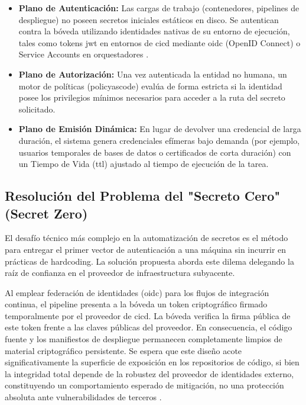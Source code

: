 \documentclass[runningheads]{llncs}
\begin{document}
\begin{itemize}
    \item \textbf{Plano de Autenticación:} Las cargas de trabajo (contenedores, pipelines de despliegue) no poseen secretos iniciales estáticos en disco. Se autentican contra la bóveda utilizando identidades nativas de su entorno de ejecución, tales como tokens \gls{jwt} en entornos de \gls{cicd} mediante \gls{oidc} (OpenID Connect) o Service Accounts en orquestadores \parencite{rfc7519_jwt,oidc_core_1_0}.
    \item \textbf{Plano de Autorización:} Una vez autenticada la entidad no humana, un motor de políticas (\gls{policyascode}) evalúa de forma estricta si la identidad posee los privilegios mínimos necesarios para acceder a la ruta del secreto solicitado.
    \item \textbf{Plano de Emisión Dinámica:} En lugar de devolver una credencial de larga duración, el sistema genera credenciales efímeras bajo demanda (por ejemplo, usuarios temporales de bases de datos o certificados de corta duración) con un Tiempo de Vida (\gls{ttl}) ajustado al tiempo de ejecución de la tarea.
\end{itemize}

\subsection{Resolución del Problema del "Secreto Cero" (Secret Zero)}
El desafío técnico más complejo en la automatización de secretos es el método para entregar el primer vector de autenticación a una máquina sin incurrir en prácticas de hardcoding. La solución propuesta aborda este dilema delegando la raíz de confianza en el proveedor de infraestructura subyacente. 

Al emplear federación de identidades (\gls{oidc}) para los flujos de integración continua, el pipeline presenta a la bóveda un token criptográfico firmado temporalmente por el proveedor de \gls{cicd}. La bóveda verifica la firma pública de este token frente a las claves públicas del proveedor. En consecuencia, el código fuente y los manifiestos de despliegue permanecen completamente limpios de material criptográfico persistente. Se espera que este diseño acote significativamente la superficie de exposición en los repositorios de código, si bien la integridad total depende de la robustez del proveedor de identidades externo, constituyendo un comportamiento esperado de mitigación, no una protección absoluta ante vulnerabilidades de terceros \parencite{oidc_core_1_0}.
\end{document}
